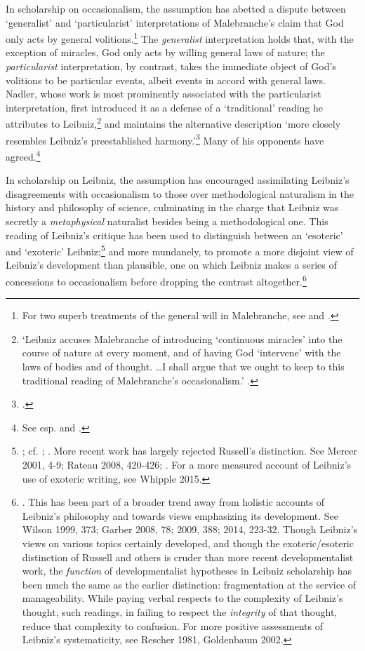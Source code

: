 \documentclass{article}
\begin{document}
In scholarship on occasionalism, the assumption has abetted a dispute
between `generalist' and `particularist' interpretations of
Malebranche's claim that God only acts by general volitions.\footnote{For
  two superb treatments of the general will in Malebranche, see \autocite{Schmaltz2008} and \autocite{Wahl2011}.} The \emph{generalist} interpretation holds that,
with the exception of miracles, God only acts by willing general laws of
nature; the \emph{particularist} interpretation, by contrast, takes the
immediate object of God's volitions to be particular events, albeit
events in accord with general laws. Nadler, whose work is most
prominently associated with the particularist interpretation, first
introduced it as a defense of a `traditional' reading he attributes to
Leibniz,\footnote{`Leibniz accuses Malebranche of introducing
  `continuous miracles' into the course of nature at every moment, and
  of having God `intervene' with the laws of bodies and of thought.
  \ldots I shall argue that we ought to keep to this traditional
  reading of Malebranche's occasionalism.' \autocite[32]{Nadler1993}.} and
maintains the alternative description `more closely resembles Leibniz's
preestablished harmony.'\footnote{\autocite[31]{Nadler1993}.} Many of his
opponents have agreed.\footnote{See esp. \autocite{Clarke1995} and \autocite{Scott1997}.}

In scholarship on Leibniz, the assumption has encouraged assimilating
Leibniz's disagreements with occasionalism to those over methodological
naturalism in the history and philosophy of science, culminating in the
charge that Leibniz was secretly a \emph{metaphysical} naturalist
besides being a methodological one. This reading of Leibniz's critique
has been used to distinguish between an `esoteric' and `exoteric'
Leibniz;\footnote{\autocite{Russell1951}; cf. \autocite{Shields1986}; \autocite[277-281]{Wilson1989}.
  More recent work has largely rejected Russell's distinction. See
  Mercer 2001, 4-9; Rateau 2008, 420-426; \autocite{Antognazza2009}. For a more
  measured account of Leibniz's use of exoteric writing, see Whipple
  2015.} and more mundanely, to promote a more disjoint view of
Leibniz's development than plausible, one on which Leibniz makes a
series of concessions to occasionalism before dropping the contrast
altogether.\footnote{\autocite{Scott1997}. This has been part of a broader trend
  away from holistic accounts of Leibniz's philosophy and towards views
  emphasizing its development. See Wilson 1999, 373; Garber 2008, 78;
  2009, 388; 2014, 223-32. Though Leibniz's views on various topics
  certainly developed, and though the exoteric/esoteric distinction of
  Russell and others is cruder than more recent developmentalist work,
  the \emph{function} of developmentalist hypotheses in Leibniz
  scholarship has been much the same as the earlier distinction:
  fragmentation at the service of manageability. While paying verbal
  respects to the complexity of Leibniz's thought, such readings, in
  failing to respect the \emph{integrity} of that thought, reduce that
  complexity to confusion. For more positive assessments of Leibniz's
  systematicity, see Rescher 1981, Goldenbaum 2002.}
\end{document}
